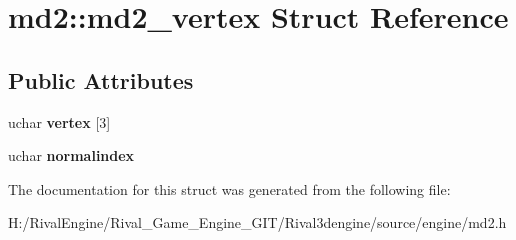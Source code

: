 \hypertarget{structmd2_1_1md2__vertex}{}\section{md2\+:\+:md2\+\_\+vertex Struct Reference}
\label{structmd2_1_1md2__vertex}
\subsection*{Public Attributes}
\begin{DoxyCompactItemize}
\item 
\mbox{\label{structmd2_1_1md2__vertex_ab9246d0d333954a7d5ba024dc227f84f}} 
uchar {\bfseries vertex} \mbox{[}3\mbox{]}
\item 
\mbox{\label{structmd2_1_1md2__vertex_a60f7dc93287d68b6f7ce83a2c392957a}} 
uchar {\bfseries normalindex}
\end{DoxyCompactItemize}


The documentation for this struct was generated from the following file\+:\begin{DoxyCompactItemize}
\item 
H\+:/\+Rival\+Engine/\+Rival\+\_\+\+Game\+\_\+\+Engine\+\_\+\+G\+I\+T/\+Rival3dengine/source/engine/md2.\+h\end{DoxyCompactItemize}
